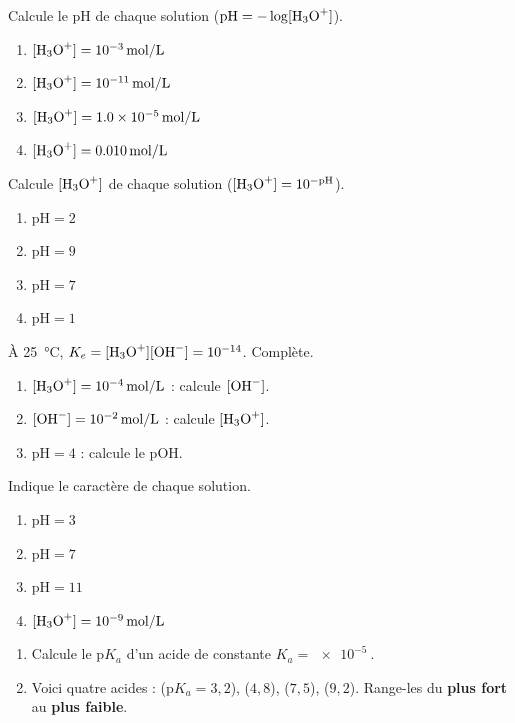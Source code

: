 \documentclass[11pt,a4paper]{article}
\begin{document}

\begin{exo}[de la concentration au pH]
Calcule le pH de chaque solution ($\mathrm{pH} = -\log[\ce{H3O+}]$).
\begin{enumerate}[label=\alph*)]
  \item $[\ce{H3O+}] = \qty{e-3}{mol\per L}$
  \item $[\ce{H3O+}] = \qty{e-11}{mol\per L}$
  \item $[\ce{H3O+}] = \qty{1,0e-5}{mol\per L}$
  \item $[\ce{H3O+}] = \qty{0,010}{mol\per L}$
\end{enumerate}
\end{exo}

\begin{exo}[du pH à la concentration]
Calcule $[\ce{H3O+}]$ de chaque solution ($[\ce{H3O+}] = 10^{-\mathrm{pH}}$).
\begin{enumerate}[label=\alph*)]
  \item $\mathrm{pH} = 2$
  \item $\mathrm{pH} = 9$
  \item $\mathrm{pH} = 7$
  \item $\mathrm{pH} = 1$
\end{enumerate}
\end{exo}

\begin{exo}
À \qty{25}{\celsius}, $K_e = [\ce{H3O+}][\ce{OH-}] = 10^{-14}$. Complète.
\begin{enumerate}[label=\alph*)]
  \item $[\ce{H3O+}] = \qty{e-4}{mol\per L}$ : calcule $[\ce{OH-}]$.
  \item $[\ce{OH-}] = \qty{e-2}{mol\per L}$ : calcule $[\ce{H3O+}]$.
  \item $\mathrm{pH} = 4$ : calcule le pOH.
\end{enumerate}
\end{exo}

\begin{exo}
Indique le caractère de chaque solution.
\begin{enumerate}[label=\alph*)]
  \item $\mathrm{pH} = 3$
  \item $\mathrm{pH} = 7$
  \item $\mathrm{pH} = 11$
  \item $[\ce{H3O+}] = \qty{e-9}{mol\per L}$
\end{enumerate}
\end{exo}

\begin{exo}
\begin{enumerate}[label=\alph*)]
  \item Calcule le $\mathrm{p}K_a$ d'un acide de constante $K_a = \qty{e-5}{}$.
  \item Voici quatre acides :  ($\mathrm{p}K_a = 3{,}2$),  ($4{,}8$),  ($7{,}5$),
         ($9{,}2$). Range-les du \textbf{plus fort} au \textbf{plus faible}.
\end{enumerate}
\end{exo}
\end{document}
